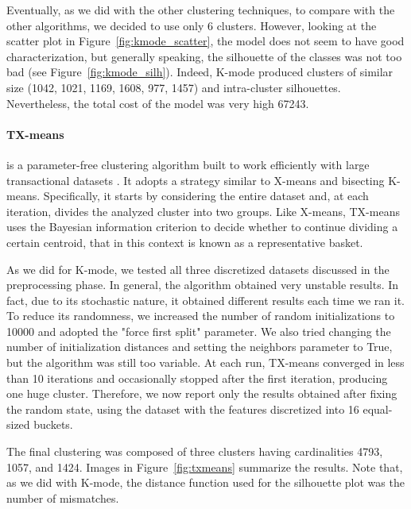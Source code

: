 \documentclass[10pt, a4paper, twocolumn]{article}
\begin{document}
Eventually, as we did with the other clustering techniques, to compare with the other algorithms, we decided to use only 6 clusters. However, looking at the scatter plot in Figure~\ref{fig:kmode_scatter}, the model does not seem to have good characterization, but generally speaking, the silhouette of the classes was not too bad (see Figure~\ref{fig:kmode_silh}). Indeed, K-mode produced clusters of similar size (1042, 1021, 1169, 1608, 977, 1457) and intra-cluster silhouettes. Nevertheless, the total cost of the model was very high \num{67243}.

\paragraph{TX-means} is a parameter-free clustering algorithm built to work efficiently with large transactional datasets \parencite{guidott:2017}. It adopts a strategy similar to X-means and bisecting K-means. Specifically, it starts by considering the entire dataset and, at each iteration, divides the analyzed cluster into two groups. Like X-means, TX-means uses the Bayesian information criterion to decide whether to continue dividing a certain centroid, that in this context is known as a representative basket. 

As we did for K-mode, we tested all three discretized datasets discussed in the preprocessing phase. In general, the algorithm obtained very unstable results. In fact, due to its stochastic nature, it obtained different results each time we ran it. To reduce its randomness, we increased the number of random initializations to \num{10000} and adopted the "force first split" parameter. We also tried changing the number of initialization distances and setting the neighbors parameter to True, but the algorithm was still too variable. At each run, TX-means converged in less than 10 iterations and occasionally stopped after the first iteration, producing one huge cluster. Therefore, we now report only the results obtained after fixing the random state, using the dataset with the features discretized into 16 equal-sized buckets. 

The final clustering was composed of three clusters having cardinalities 4793, 1057, and 1424. Images in Figure~\ref{fig:txmeans} summarize the results. Note that, as we did with K-mode, the distance function used for the silhouette plot was the number of mismatches.
\end{document}
